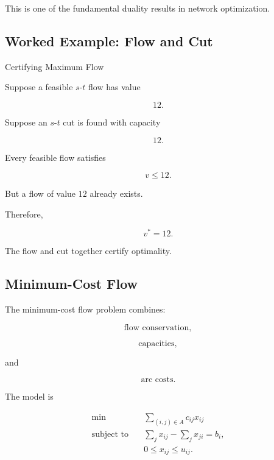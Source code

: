 This is one of the fundamental duality results in network optimization.

\subsection{Worked Example: Flow and Cut}
\label{subsec:worked-flow-cut}

\begin{workedexamplebox}{Certifying Maximum Flow}

Suppose a feasible \(s\)-\(t\) flow has value

\[
12.
\]

Suppose an \(s\)-\(t\) cut is found with capacity

\[
12.
\]

Every feasible flow satisfies

\[
v\leq12.
\]

But a flow of value \(12\) already exists.

Therefore,

\begin{answerbox}
\[
\boxed{
v^*=12.
}
\]

The flow and cut together certify optimality.
\end{answerbox}

\end{workedexamplebox}

\subsection{Minimum-Cost Flow}
\label{subsec:minimum-cost-flow}

The minimum-cost flow problem combines:

\[
\boxed{
\text{flow conservation},
}
\]

\[
\boxed{
\text{capacities},
}
\]

and

\[
\boxed{
\text{arc costs}.
}
\]

The model is

\[
\boxed{
\begin{aligned}
\min
\quad&
\sum_{(i,j)\in A}
c_{ij}x_{ij}
\\
\text{subject to}
\quad&
\sum_jx_{ij}
-
\sum_jx_{ji}
=
b_i,
\\
&
0\leq x_{ij}\leq u_{ij}.
\end{aligned}
}
\]

